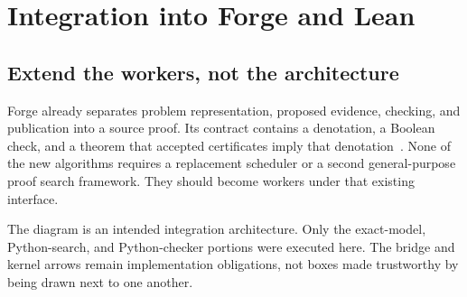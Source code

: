 \section{Integration into Forge and Lean}
\label{sec:integration}

\subsection{Extend the workers, not the architecture}

Forge already separates problem representation, proposed evidence, checking,
and publication into a source proof. Its  contract
contains a denotation, a Boolean check, and a theorem that accepted certificates
imply that denotation~\cite{forge-contract}. None of the new algorithms requires
a replacement scheduler or a second general-purpose proof search framework.
They should become workers under that existing interface.

\begin{center}
\end{center}

The diagram is an intended integration architecture. Only the exact-model,
Python-search, and Python-checker portions were executed here. The bridge and
kernel arrows remain implementation obligations, not boxes made trustworthy by
being drawn next to one another.

